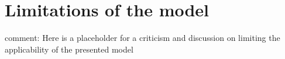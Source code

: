 \section{Limitations of the model}
comment: Here is a placeholder for a criticism and discussion on limiting the applicability of the presented model
